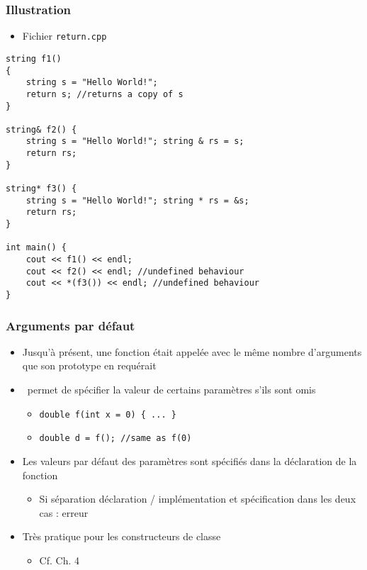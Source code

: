 \begin{frame}[containsverbatim]
\frametitle{Illustration}
\begin{itemize}
\item Fichier \texttt{return.cpp}
\end{itemize}
\begin{lstlisting}
string f1()
{
    string s = "Hello World!";
    return s; //returns a copy of s
}

string& f2() {
    string s = "Hello World!"; string & rs = s;
    return rs;
}

string* f3() {
    string s = "Hello World!"; string * rs = &s;
    return rs;
}

int main() {
    cout << f1() << endl;
    cout << f2() << endl; //undefined behaviour
    cout << *(f3()) << endl; //undefined behaviour
}
\end{lstlisting}
\end{frame}

\begin{frame}
\frametitle{Arguments par défaut}
\begin{itemize}[<+->]
\item Jusqu'à présent, une fonction était appelée avec le même nombre d'arguments que son prototype en requérait
\item \cpp\ permet de spécifier la valeur de certains paramètres s'ils sont omis
	\begin{itemize}
	\item \lstinline|double f(int x = 0) { ... }|
	\item \lstinline|double d = f(); //same as f(0)|
	\end{itemize}
\item Les valeurs par défaut des paramètres sont spécifiés dans la déclaration de la fonction
	\begin{itemize}
	\item Si séparation déclaration / implémentation et spécification dans les deux cas : erreur
	\end{itemize}
\item Très pratique pour les constructeurs de classe
	\begin{itemize}
	\item Cf. Ch. 4
	\end{itemize}
\end{itemize}
\end{frame}

